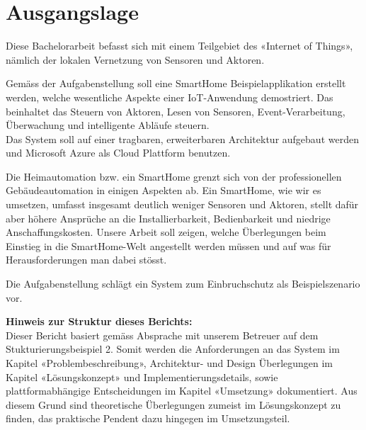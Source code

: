 \section{Ausgangslage}
Diese Bachelorarbeit befasst sich mit einem Teilgebiet des «Internet of Things», nämlich der lokalen Vernetzung von Sensoren und Aktoren.

Gemäss der Aufgabenstellung soll eine SmartHome Beispielapplikation erstellt werden, welche wesentliche Aspekte  einer IoT-Anwendung demostriert. Das beinhaltet das Steuern von Aktoren, Lesen von Sensoren, Event-Verarbeitung, Überwachung und intelligente Abläufe steuern. \\
Das System soll auf einer tragbaren, erweiterbaren Architektur aufgebaut werden und Microsoft Azure als Cloud Plattform benutzen.

Die Heimautomation bzw. ein SmartHome grenzt sich von der professionellen Gebäudeautomation in einigen Aspekten ab. Ein SmartHome, wie wir es umsetzen, umfasst insgesamt deutlich weniger Sensoren und Aktoren, stellt dafür aber höhere Ansprüche an die Installierbarkeit, Bedienbarkeit und niedrige Anschaffungskosten. Unsere Arbeit soll zeigen, welche Überlegungen beim Einstieg in die SmartHome-Welt angestellt werden müssen und auf was für Herausforderungen man dabei stösst.

Die Aufgabenstellung schlägt ein System zum Einbruchschutz als Beispielszenario vor.


\textbf{Hinweis zur Struktur dieses Berichts:}\\
Dieser Bericht basiert gemäss Absprache mit unserem Betreuer auf dem Stukturierungsbeispiel 2. Somit werden die Anforderungen an das System im Kapitel «Problembeschreibung», Architektur- und Design Überlegungen im Kapitel «Lösungskonzept» und Implementierungsdetails, sowie plattformabhängige Entscheidungen im Kapitel «Umsetzung» dokumentiert. Aus diesem Grund sind theoretische Überlegungen zumeist im Lösungskonzept zu finden, das praktische Pendent dazu hingegen im Umsetzungsteil.
